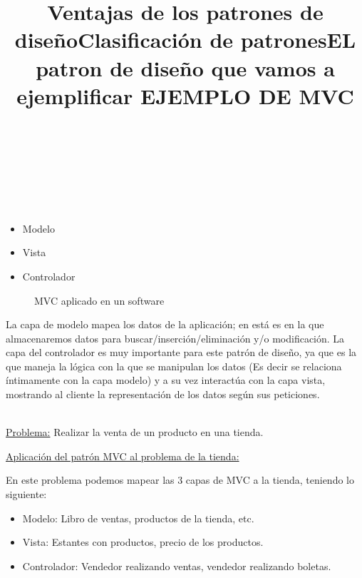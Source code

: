 \documentclass[a4paper,11pt]{report}
\begin{document}
\title{\textbf{Ventajas de los patrones de diseño}}\\



\title{\textbf{Clasificación de patrones}}\\



\title{\textbf{EL patron de diseño que vamos a ejemplificar}}\\






\begin{itemize}
    \item{Modelo}
    \item{Vista}
    \item{Controlador}
\end{itemize}

\begin{figure}[!ht]
\begin{center}

\caption{MVC aplicado en un software}
\end{center}
\end{figure}


 \newpage
La capa de modelo mapea los datos de la aplicación; en está es en la que almacenaremos datos para buscar/inserción/eliminación y/o modificación.
La capa del controlador es muy importante para este patrón de diseño, ya que es la
que maneja la lógica con la que se manipulan los datos (Es decir se relaciona íntimamente con
la capa modelo) y a su vez interactúa con la capa vista, mostrando al cliente la representación de los datos según sus peticiones.\\

\title {\textbf{ EJEMPLO DE MVC}}\\

\underline{Problema:} Realizar la venta de un producto en una tienda.

\underline{Aplicación del patrón MVC al problema de la tienda:}

En este problema podemos mapear las 3 capas de MVC a la tienda, teniendo lo siguiente:

\begin{itemize}
    \item{Modelo:} Libro de ventas, productos de la tienda, etc. 
    \item{Vista:} Estantes con productos, precio de los productos.
    \item{Controlador:} Vendedor realizando ventas, vendedor realizando boletas.
\end{itemize}
\end{document}
